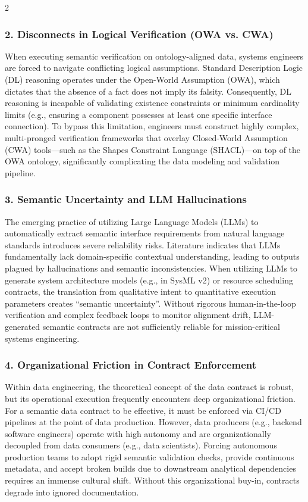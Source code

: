 \documentclass[11pt,letterpaper]{article}
\begin{document}
\begin{multicols*}{2}
\subsubsection{2. Disconnects in Logical Verification (OWA vs. CWA)}
When executing semantic verification on ontology-aligned data, systems engineers are forced to navigate conflicting logical assumptions. Standard Description Logic (DL) reasoning operates under the Open-World Assumption (OWA), which dictates that the absence of a fact does not imply its falsity. Consequently, DL reasoning is incapable of validating existence constraints or minimum cardinality limits (e.g., ensuring a component possesses at least one specific interface connection). To bypass this limitation, engineers must construct highly complex, multi-pronged verification frameworks that overlay Closed-World Assumption (CWA) tools—such as the Shapes Constraint Language (SHACL)—on top of the OWA ontology, significantly complicating the data modeling and validation pipeline.

\subsubsection{3. Semantic Uncertainty and LLM Hallucinations}
The emerging practice of utilizing Large Language Models (LLMs) to automatically extract semantic interface requirements from natural language standards introduces severe reliability risks. Literature indicates that LLMs fundamentally lack domain-specific contextual understanding, leading to outputs plagued by hallucinations and semantic inconsistencies. When utilizing LLMs to generate system architecture models (e.g., in SysML v2) or resource scheduling contracts, the translation from qualitative intent to quantitative execution parameters creates ``semantic uncertainty''. Without rigorous human-in-the-loop verification and complex feedback loops to monitor alignment drift, LLM-generated semantic contracts are not sufficiently reliable for mission-critical systems engineering.

\subsubsection{4. Organizational Friction in Contract Enforcement}
Within data engineering, the theoretical concept of the data contract is robust, but its operational execution frequently encounters deep organizational friction. For a semantic data contract to be effective, it must be enforced via CI/CD pipelines at the point of data production. However, data producers (e.g., backend software engineers) operate with high autonomy and are organizationally decoupled from data consumers (e.g., data scientists). Forcing autonomous production teams to adopt rigid semantic validation checks, provide continuous metadata, and accept broken builds due to downstream analytical dependencies requires an immense cultural shift. Without this organizational buy-in, contracts degrade into ignored documentation.


\end{multicols*}
\end{document}
